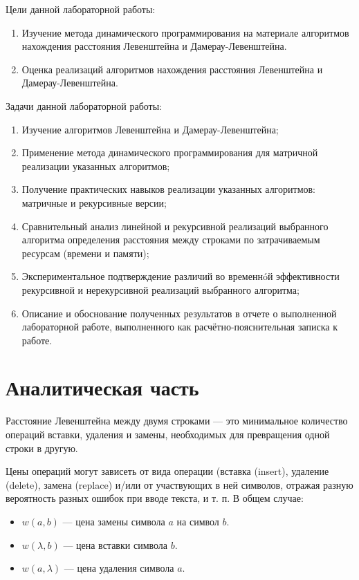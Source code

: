 \documentclass[12pt]{report}
\begin{document}
Цели данной лабораторной работы: 
\begin{enumerate}
	\item Изучение метода динамического программирования на материале алгоритмов нахождения расстояния Левенштейна и Дамерау-Левенштейна.
	\item Оценка реализаций алгоритмов нахождения расстояния Левенштейна и Дамерау-Левенштейна.
\end{enumerate}

Задачи данной лабораторной работы:
\begin{enumerate}
  	\item Изучение алгоритмов Левенштейна и Дамерау-Левенштейна;
	\item Применение метода динамического программирования для матричной реализации указанных алгоритмов; 
	\item Получение практических навыков реализации указанных алгоритмов: матричные и рекурсивные версии; 
	\item Сравнительный анализ линейной и рекурсивной реализаций выбранного алгоритма определения расстояния между строками по затрачиваемым ресурсам (времени и памяти); 
	\item Экспериментальное подтверждение различий во временнóй эффективности рекурсивной и
нерекурсивной реализаций выбранного алгоритма; 
	\item Описание и обоснование полученных результатов в отчете о выполненной лабораторной
работе, выполненного как расчётно-пояснительная записка к работе. 
\end{enumerate}

\chapter{Аналитическая часть}

Расстояние Левенштейна \cite{Levenshtein} между двумя строками — это минимальное количество операций вставки, удаления и замены, необходимых для превращения одной строки в другую.


Цены операций могут зависеть от вида операции (вставка (insert), удаление (delete), замена (replace) и/или от участвующих в ней символов, отражая разную вероятность разных ошибок при вводе текста, и т. п. В общем случае:

\begin{itemize}
	\item $w(a,b)$ — цена замены символа $a$ на символ $b$.
	\item $w(\lambda,b)$ — цена вставки символа $b$.
	\item $w(a,\lambda)$ — цена удаления символа $a$.
\end{itemize}
\end{document}
